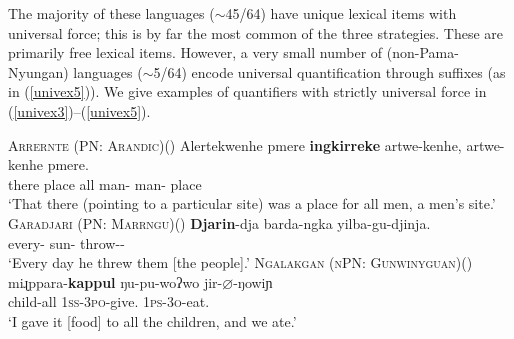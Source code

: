 \documentclass[12pt,egregdoesnotlikesansseriftitles]{scrartcl}
\begin{document}
The majority of these languages ($\sim$45/64)  have unique lexical items with universal force; this is by far the most common of the three strategies. These are primarily free lexical items. However, a very small number of (non-Pama-Nyungan) languages ($\sim$5/64) encode universal quantification  through suffixes (as in (\ref{univex5})). We give examples of quantifiers with strictly universal force in (\ref{univex3})--(\ref{univex5}).

\begin{exe}
  \ex  \textsc{Arrernte (PN: Arandic)}\hfill (\citealt[132]{wilkins89})
  \gll Alertekwenhe pmere \textbf{ingkirreke} artwe-kenhe, artwe-kenhe pmere.\\
  there place all man-\Poss{} man-\Poss{} place\\
  \glt `That there (pointing to a particular site) was a place for all men, a men's site.' \label{univex3}
  \ex  \textsc{Garadjari (PN: Marrngu)}\hfill (\citealt[48]{sands89}) 
  \gll \textbf{Djarin}-dja barda-ngka yilba-gu-djinja.\\
  every-\Loc{} sun-\Loc{}   throw-\Fut-\Tpl\\
  \glt `Every day he threw them [the people].' \label{univex4}
  \ex \textsc{Ngalakgan (nPN: Gunwinyguan)}\hfill (\citealt[160]{baker08}) \label{univex5}
  \gll  miɻppara-\textbf{kappul}   ŋu-pu-woʔwo      jir-$\varnothing$-ŋowiɲ\\
  child-all 1\textsc{ss-3po}-give.\Pp{} 1\textsc{ps-3o}-eat.\Pcon\\
  \glt `I gave it [food] to all the children, and we ate.'
\end{exe}
\end{document}
